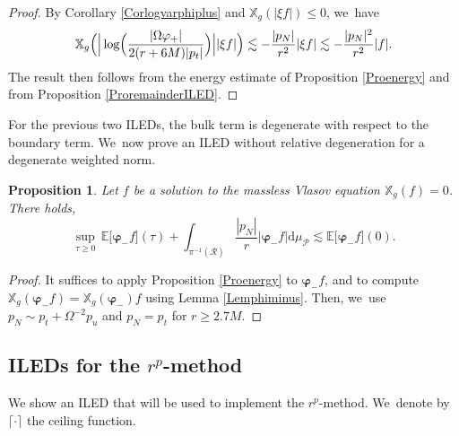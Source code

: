 \documentclass[JEP,XML,SOM,Unicode,published]{cedram}
\theoremstyle{plain}
\newtheorem{proposition}{Proposition}[section]
\theoremstyle{definition}
\newcommand\T{{\mathbb{X}}}
\newcommand\dr{{\mathrm{d}}}
\begin{document}
\begin{proof}
By Corollary \ref{Corlogvarphiplus} and $\T_g(|\xi f|)\leq 0$, we~have
\[
\T_g \Bigl(\Big| \log \Bigl(\frac{|\Omega \varphi_+ |}{2(r+6M)|p_t|} \Bigr) \Big| |\xi f| \Bigr) \lesssim - \frac{|p_N|}{r^2} |\xi f| \lesssim -\frac{|p_N|^2}{r^2}|f|.
\]
The result then follows from the energy estimate of Proposition \ref{Proenergy} and from Proposition \ref{ProremainderILED}.
\end{proof}

For the previous two ILEDs, the bulk term is degenerate with respect to the boundary term. We~now prove an ILED without relative degeneration for a degenerate weighted norm.

\begin{proposition}\label{ProILED000}
Let $f $ be a solution to the massless Vlasov equation $\T_g(f)=0$. There holds,
\[
\sup_{\tau \geq 0} \,\mathbb{E} \bigl[ \pmb{\varphi}_- f \bigr](\tau) + \int_{\pi^{-1}(\mathcal{R})} \frac{|p_N|}{r} \big|\pmb{\varphi}_- f \big| \dr \mu_{\mathcal{P}} \lesssim \mathbb{E} \bigl[ \pmb{\varphi}_- f \bigr](0).
\]
\end{proposition}
\begin{proof}
It suffices to apply Proposition \ref{Proenergy} to $\pmb{\varphi}_- f$, and to compute $\T_g(\pmb{\varphi}_- f)=\T_g(\pmb{\varphi}_-)f$ using Lemma \ref{Lemphiminus}. Then, we~use $p_N \sim p_t+\Omega^{-2} p_u$ and $p_N=p_t$ for $r \geq 2.7M$.
\end{proof}

\subsection{ILEDs for the $r^p$-method}

We show an ILED that will be used to implement the $r^p$-method. We~denote by $\lceil \cdot \rceil$ the ceiling function.
\end{document}
